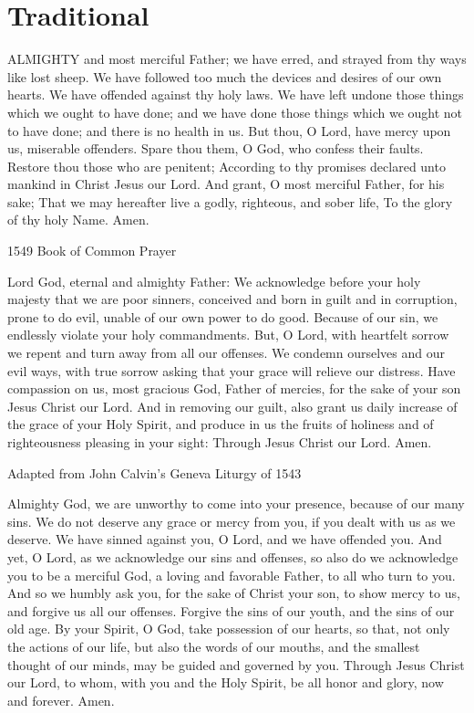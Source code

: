 \documentclass[]{book}
\begin{document}
\section{Traditional}\label{traditional}

ALMIGHTY and most merciful Father; we have erred, and strayed from thy
ways like lost sheep. We have followed too much the devices and desires
of our own hearts. We have offended against thy holy laws. We have left
undone those things which we ought to have done; and we have done those
things which we ought not to have done; and there is no health in us.
But thou, O Lord, have mercy upon us, miserable offenders. Spare thou
them, O God, who confess their faults. Restore thou those who are
penitent; According to thy promises declared unto mankind in Christ
Jesus our Lord. And grant, O most merciful Father, for his sake; That we
may hereafter live a godly, righteous, and sober life, To the glory of
thy holy Name. Amen.

1549 Book of Common Prayer

Lord God, eternal and almighty Father: We acknowledge before your holy
majesty that we are poor sinners, conceived and born in guilt and in
corruption, prone to do evil, unable of our own power to do good.
Because of our sin, we endlessly violate your holy commandments. But, O
Lord, with heartfelt sorrow we repent and turn away from all our
offenses. We condemn ourselves and our evil ways, with true sorrow
asking that your grace will relieve our distress. Have compassion on us,
most gracious God, Father of mercies, for the sake of your son Jesus
Christ our Lord. And in removing our guilt, also grant us daily increase
of the grace of your Holy Spirit, and produce in us the fruits of
holiness and of righteousness pleasing in your sight: Through Jesus
Christ our Lord. Amen.

Adapted from John Calvin's Geneva Liturgy of 1543

Almighty God, we are unworthy to come into your presence, because of our
many sins. We do not deserve any grace or mercy from you, if you dealt
with us as we deserve. We have sinned against you, O Lord, and we have
offended you. And yet, O Lord, as we acknowledge our sins and offenses,
so also do we acknowledge you to be a merciful God, a loving and
favorable Father, to all who turn to you. And so we humbly ask you, for
the sake of Christ your son, to show mercy to us, and forgive us all our
offenses. Forgive the sins of our youth, and the sins of our old age. By
your Spirit, O God, take possession of our hearts, so that, not only the
actions of our life, but also the words of our mouths, and the smallest
thought of our minds, may be guided and governed by you. Through Jesus
Christ our Lord, to whom, with you and the Holy Spirit, be all honor and
glory, now and forever. Amen.
\end{document}
